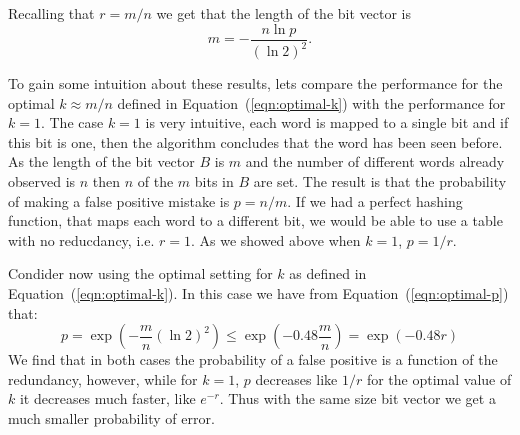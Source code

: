 Recalling  that $r=m/n$ we get that the length of the bit vector is
\[m=-\frac{n\ln p}{(\ln 2)^2}.\]

To gain some intuition about these results, lets compare the
performance for the optimal $k\approx m/n$ defined in
Equation~(\ref{eqn:optimal-k}) with the performance for $k=1$.  The case
$k=1$ is very intuitive, each word is mapped to a single bit and if
this bit is one, then the algorithm concludes that the word has been
seen before. As the length of the bit vector $B$ is $m$ and the number
of different words already observed is $n$ then $n$ of the $m$ bits in
$B$ are set. The result is that the probability of making a false
positive mistake is $p=n/m$. If we had a perfect hashing
function, that maps each word to a different bit, we would be able to
use a table with no reducdancy, i.e. $r=1$. As we showed above when
$k=1$, $p=1/r$.

Condider now using the optimal setting for $k$ as defined in
Equation~(\ref{eqn:optimal-k}). In this case we have from
Equation~(\ref{eqn:optimal-p}) that:
\[
p = \exp\left( -\frac{m}{n} \left(\ln 2\right)^2 \right) \leq
    \exp\left( -0.48 \frac{m}{n} \right)
=  \exp\left( -0.48 r \right)
\]
We find that in both cases the probability of a false positive is a
function of the redundancy, however, while for $k=1$, $p$ decreases
like $1/r$ for the optimal value of $k$ it decreases much faster, like $e^{-r}$.
Thus with the same size bit vector we get a much smaller probability
of error.




